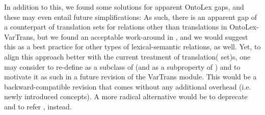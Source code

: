 \noindent
In addition to this, we found some solutions for apparent OntoLex gaps, and these may even entail future simplifications:
As such, there is an apparent gap of a counterpart of translation sets for relations other than translations in OntoLex-VarTrans, 
but we found an acceptable work-around in , and we would suggest this as a best practice for other types of lexical-semantic relations, as well. Yet, to align this approach better with the current treatment of translation( set)s, one may consider to  re-define  as a subclass of  (and  as a subproperty of ) and to motivate it as such in a future revision of the VarTrans module. This would be a backward-compatible revision that comes without any additional overhead (i.e. newly introduced concepts). A more radical alternative would be to deprecate  and to refer , instead.

